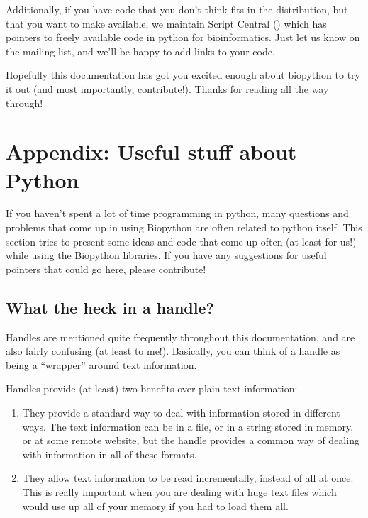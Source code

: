 \documentclass{report}
\begin{document}
Additionally, if you have code that you don't think fits in the distribution, but that you want to make available, we maintain Script Central () which has pointers to freely available code in python for bioinformatics. Just let us know on the mailing list, and we'll be happy to add links to your code.


Hopefully this documentation has got you excited enough about
biopython to try it out (and most importantly, contribute!). Thanks
for reading all the way through!

\chapter{Appendix: Useful stuff about Python}
\label{sec:appendix}

If you haven't spent a lot of time programming in python, many
questions and problems that come up in using Biopython are often
related to python itself. This section tries to present some ideas and 
code that come up often (at least for us!) while using the Biopython
libraries. If you have any suggestions for useful pointers that could
go here, please contribute!

\section{What the heck in a handle?}
\label{sec:appendix-handles}

Handles are mentioned quite frequently throughout this documentation,
and are also fairly confusing (at least to me!). Basically, you can
think of a handle as being a ``wrapper'' around text information.


Handles provide (at least) two benefits over plain text information:

\begin{enumerate}
  \item They provide a standard way to deal with information stored in 
  different ways. The text information can be in a file, or in a
  string stored in memory, or at some remote website, but the handle
  provides a common way of dealing with information in all of these
  formats. 

  \item They allow text information to be read incrementally, instead
  of all at once. This is really important when you are dealing with
  huge text files which would use up all of your memory if you had to
  load them all.
\end{enumerate}
\end{document}
